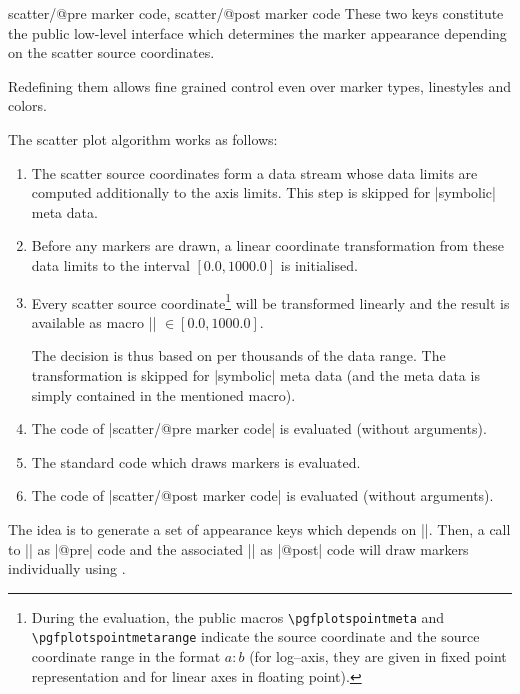 \begin{pgfplotsxycodekeylist}{
	scatter/@pre marker code,
	scatter/@post marker code}
	These two keys constitute the public low-level interface which determines the marker appearance depending on the scatter source coordinates.

	Redefining them allows fine grained control even over marker types, linestyles and colors.

	The scatter plot algorithm works as follows:
\begin{enumerate} 
\item The scatter source coordinates form a data stream whose data limits are computed additionally to the axis limits. This step is skipped for |symbolic| meta data.
\item Before any markers are drawn, a linear coordinate transformation from these data limits to the interval $[0.0,1000.0]$ is initialised. 
\item Every scatter source coordinate\footnote{During the evaluation, the public macros \texttt{\textbackslash pgfplotspointmeta} and \texttt{\textbackslash pgfplotspointmetarange} indicate the source coordinate and the source coordinate range in the format $a:b$ (for log--axis, they are given in fixed point representation and for linear axes in floating point).} will be transformed linearly and the result is available as macro |\pgfplotspointmetatransformed| $ \in [0.0,1000.0]$.

The decision is thus based on per thousands of the data range. The transformation is skipped for |symbolic| meta data (and the meta data is simply contained in the mentioned macro).
\item The code of |scatter/@pre marker code| is evaluated (without arguments).
\item The standard code which draws markers is evaluated.
\item The code of |scatter/@post marker code| is evaluated (without arguments).
\end{enumerate}
	The idea is to generate a set of appearance keys which depends on |\pgfplotspointmetatransformed|. Then, a call to |\scope| as |@pre| code and the associated |\endscope| as |@post| code will draw markers individually using .


\end{pgfplotsxycodekeylist}

